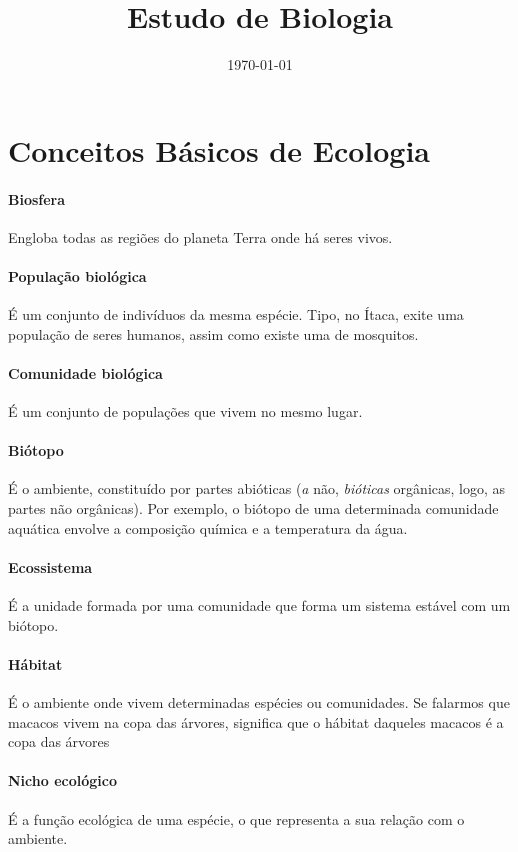 \documentclass{article}
\author{}
\date{\today}
\title{Estudo de Biologia}
\begin{document}
\maketitle
\tableofcontents

\section{Conceitos Básicos de Ecologia}
\paragraph{Biosfera} Engloba todas as regiões do planeta Terra onde há seres vivos.
\paragraph{População biológica} É um conjunto de indivíduos da mesma espécie. Tipo, no Ítaca, exite uma população de seres humanos, assim como existe uma de mosquitos.
\paragraph{Comunidade biológica} É um conjunto de populações que vivem no mesmo lugar.
\paragraph{Biótopo} É o ambiente, constituído por partes abióticas (\textit{a} \textrightarrow{} não, \textit{bióticas} \textrightarrow{} orgânicas, logo, as partes não orgânicas).  Por exemplo, o biótopo de uma determinada comunidade aquática envolve a composição química e a temperatura da água.
\paragraph{Ecossistema} É a unidade formada por uma comunidade que forma um sistema estável com um biótopo.
\paragraph{Hábitat} É o ambiente onde vivem determinadas espécies ou comunidades. Se falarmos que macacos vivem na copa das árvores, significa que o hábitat daqueles macacos é a copa das árvores 
\paragraph{Nicho ecológico} É a função ecológica de uma espécie, o que representa a sua relação com o ambiente.
\end{document}
